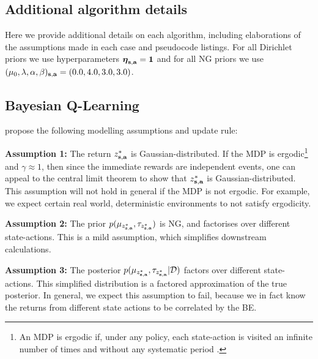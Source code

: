 \documentclass{article}
\begin{document}
\clearpage
\begin{appendices}
\section{Additional algorithm details}

Here we provide additional details on each algorithm, including elaborations of the assumptions made in each case and pseudocode listings. For all Dirichlet priors we use hyperparameters $\boldsymbol{\eta}_{\mathbf{s}, \mathbf{a}} = \mathbf{1}$ and for all NG priors we use $(\mu_0, \lambda, \alpha, \beta)_{\mathbf{s}, \mathbf{a}} = (0.0, 4.0, 3.0, 3.0)$.

\subsection{Bayesian Q-Learning} \label{app:bql}

\cite{bqlearning} propose the following modelling assumptions and update rule:

\textbf{Assumption 1:} The return $z^*_{\mathbf{s}, \mathbf{a}}$ is Gaussian-distributed. If the MDP is ergodic\footnote{An MDP is ergodic if, under any policy, each state-action is visited an infinite number of times and without any systematic period \citep{silver}.} and $\gamma \approx 1$, then since the immediate rewards are independent events, one can appeal to the central limit theorem to show that $z^*_{\mathbf{s}, \mathbf{a}}$ is Gaussian-distributed. This assumption will not hold in general if the MDP is not ergodic. For example, we expect certain real world, deterministic environments to not satisfy ergodicity.

\textbf{Assumption 2:} The prior $p(\mu_{z^*_{\mathbf{s}, \mathbf{a}}}, \tau_{z^*_{\mathbf{s}, \mathbf{a}}})$ is NG, and factorises over different state-actions. This is a mild assumption, which simplifies downstream calculations.

\textbf{Assumption 3:} The posterior $p(\mu_{z^*_{\mathbf{s}, \mathbf{a}}}, \tau_{z^*_{\mathbf{s}, \mathbf{a}}}| \mathcal{D})$ factors over different state-actions. This simplified distribution is a factored approximation of the true posterior. In general, we expect this assumption to fail, because we in fact know the returns from different state actions to be correlated by the BE.


\end{appendices}
\end{document}
